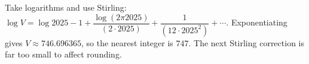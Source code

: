 Take logarithms and use Stirling: $\log V=\log2025-1+\dfrac{\log(2\pi2025)}{(2\cdot2025)}+\dfrac{1}{(12\cdot2025^2)}+\cdots$. Exponentiating gives $V\approx746.696365$, so the nearest integer is $\boxed{747}$. The next Stirling correction is far too small to affect rounding.
